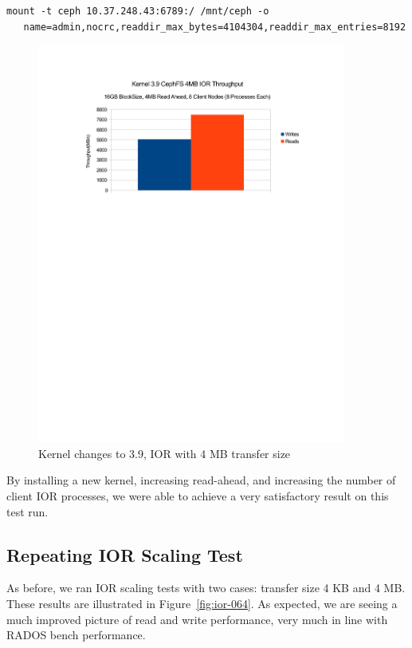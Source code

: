 \documentclass{article}
\begin{document}
\begin{Verbatim}[samepage=true]
mount -t ceph 10.37.248.43:6789:/ /mnt/ceph -o
   name=admin,nocrc,readdir_max_bytes=4104304,readdir_max_entries=8192
\end{Verbatim}


\begin{figure}[htb]
\centering
\includegraphics[width=4in]{ior-kernel-39}
\caption{Kernel changes to 3.9, IOR with 4 MB transfer size}
\label{fig:ior-kernel-39}
\end{figure}


By installing a new kernel, increasing read-ahead, and increasing the number of
client IOR processes, we were able to achieve a very satisfactory result on this
test run.


\subsection{Repeating IOR Scaling Test}

As before, we ran IOR scaling tests with two cases: transfer size 4 KB and 4 MB.
These results are illustrated in Figure~\ref{fig:ior-064}. As expected, we are
seeing a much improved picture of read and write performance, very much in
line with RADOS bench performance.
\end{document}
